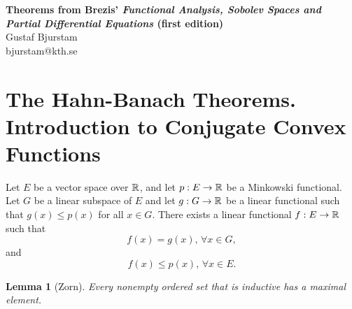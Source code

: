 \documentclass[11pt]{article}
\theoremstyle{plain}
\newtheorem{lemma}{Lemma}[section]
\begin{document}
\begin{center}
\textbf{\large Theorems from Brezis' \textit{Functional Analysis, Sobolev Spaces and Partial Differential Equations} (first edition)} \\
Gustaf Bjurstam\\
bjurstam@kth.se\\
\end{center}

\section{The Hahn-Banach Theorems. Introduction to Conjugate Convex Functions}
\begin{theorem}
    Let $E$ be a vector space over $\mathbb{R}$, and let $p:E\to\mathbb{R}$ be a Minkowski functional. Let $G$ be a linear subspace of $E$ and let $g:G\to \mathbb{R}$ be a linear functional such that $g(x)\leq p(x)$ for all $x\in G$. There exists a linear functional $f:E\to \mathbb{R}$ such that
    \begin{equation*}
        f(x)=g(x),\, \forall x\in G,
    \end{equation*}
    and 
    \begin{equation*}
        f(x)\leq p(x),\, \forall x\in E.
    \end{equation*}
\end{theorem}

\begin{lemma}[Zorn]
    Every nonempty ordered set that is inductive has a maximal element.
\end{lemma}
\end{document}
